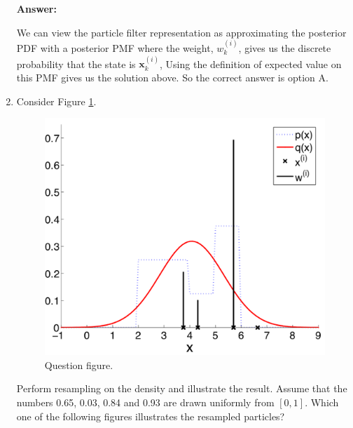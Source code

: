 \begin{enumerate}
\textbf{Answer:}

We can view the particle filter representation as approximating the posterior PDF with a posterior PMF where the weight, $w_{k}^{(i)}$, 
gives us the discrete probability that the state is $\mathbf{x}_{k}^{(i)}$, Using the definition of expected value on this PMF gives us the solution above. 
So the correct answer is option A.

\item Consider Figure \ref{P0_7_3_4_ex1}.

\begin{figure}[!htb]
\begin{center}
\includegraphics[scale=0.280]{img/particle_filters/P0_7_3_4_ex1.png}
\end{center}
\caption{Question figure.}
\label{P0_7_3_4_ex1}
\end{figure}
Perform resampling on the density and illustrate the result. Assume that the numbers 0.65, 0.03, 0.84 and 0.93 are drawn uniformly from $[0,1]$.
Which one of the following figures illustrates the resampled particles?


\end{enumerate}
